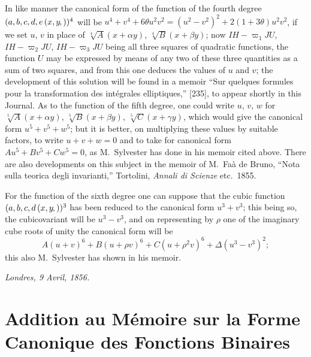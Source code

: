 \documentclass[11pt,a4paper]{article}
\newcommand{\fcn}[2]{(#1\kern-1pt, #2)}
\begin{document}
\setcounter{page}{52}

In like manner the canonical form of the function of the fourth degree
$(a,b,c,d,e\,\fcn{x,y})^4$ will be $u^4+v^4+6\theta u^2v^2 = (u^2-v^2)^2+2(1+3\theta)u^2v^2$,
if we set $u$, $v$ in place of $\sqrt[4]{A}(x+\alpha y)$, $\sqrt[4]{B}(x+\beta y)$;
now $IH-\varpi_1 JU$, $IH-\varpi_2 JU$, $IH-\varpi_3 JU$ being all three squares of
quadratic functions, the function $U$ may be expressed by means of any two of these
three quantities as a sum of two squares, and from this one deduces the values of
$u$ and $v$; the development of this solution will be found in a memoir ``Sur
quelques formules pour la transformation des int\'egrales elliptiques,'' [235], to
appear shortly in this Journal. As to the function of the fifth degree, one could
write $u$, $v$, $w$ for $\sqrt[5]{A}(x+\alpha y)$, $\sqrt[5]{B}(x+\beta y)$,
$\sqrt[5]{C}(x+\gamma y)$, which would give the canonical form $u^5+v^5+w^5$; but it
is better, on multiplying these values by suitable factors, to write $u+v+w=0$ and
to take for canonical form $Au^5+Bv^5+Cw^5=0$, as M.~Sylvester has done in his memoir
cited above. There are also developments on this subject in the memoir of M.~Fa\`a
de Bruno, ``Nota sulla teorica degli invarianti,'' Tortolini, \textit{Annali di Scienze}
etc.~1855.

For the function of the sixth degree one can suppose that the cubic function
$(a,b,c,d\,\fcn{x,y})^3$ has been reduced to the canonical form $u^3+v^3$; this being
so, the cubicovariant will be $u^3-v^3$, and on representing by $\rho$ one of the
imaginary cube roots of unity the canonical form will be
\[
A(u+v)^6 + B(u+\rho v)^6 + C(u+\rho^2 v)^6 + \Delta(u^3-v^3)^2;
\]
this also M.~Sylvester has shown in his memoir.

\medskip
\noindent\textit{Londres, 9 Avril, 1856.}

\newpage


\setcounter{page}{53}

\section*{Addition au M\'emoire sur la Forme Canonique des Fonctions Binaires}
\label{paper:233}
\end{document}
